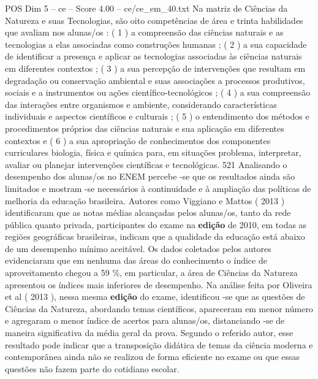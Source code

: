 \begin{textsample}{POS Dim 5 – ce – Score 4.00 – ce/ce\_em\_40.txt}
Na matriz de Ciências da Natureza e suas Tecnologias, são oito competências de área e trinta habilidades que avaliam nos alunas/os : ( 1 ) a compreensão das ciências naturais e as tecnologias a elas associadas como construções humanas ; ( 2 ) a sua capacidade de identificar a presença e aplicar as tecnologias associadas às ciências naturais em diferentes contextos ; ( 3 ) a sua percepção de intervenções que resultam em degradação ou conservação ambiental e suas associações a processos produtivos, sociais e a instrumentos ou ações científico-tecnológicos ; ( 4 ) a sua compreensão das interações entre organismos e ambiente, considerando características individuais e aspectos científicos e culturais ; ( 5 ) o entendimento dos métodos e procedimentos próprios das ciências naturais e sua aplicação em diferentes contextos e ( 6 ) a sua apropriação de conhecimentos dos componentes curriculares biologia, física e química para, em situações problema, interpretar, avaliar ou planejar intervenções científicas e tecnológicas. 521 Analisando o desempenho dos alunas/os no ENEM percebe -se que os resultados ainda são limitados e mostram -se necessários à continuidade e à ampliação das políticas de melhoria da educação brasileira.
Autores como Viggiano e Mattos ( 2013 ) identificaram que as notas médias alcançadas pelos alunas/os, tanto da rede pública quanto privada, participantes do exame na \textbf{edição} de 2010, em todas as regiões geográficas brasileiras, indicam que a qualidade da educação está abaixo de um desempenho mínimo aceitável.
Os dados coletados pelos autores evidenciaram que em nenhuma das áreas do conhecimento o índice de aproveitamento chegou a 59 \%, em particular, a área de Ciências da Natureza apresentou os índices mais inferiores de desempenho.
Na análise feita por Oliveira et al ( 2013 ), nessa mesma \textbf{edição} do exame, identificou -se que as questões de Ciências da Natureza, abordando temas científicos, apareceram em menor número e agregaram o menor índice de acertos para alunas/os, distanciando -se de maneira significativa da média geral da prova.
Segundo o referido autor, esse resultado pode indicar que a transposição didática de temas da ciência moderna e contemporânea ainda não se realizou de forma eficiente no exame ou que essas questões não fazem parte do cotidiano escolar.

\end{textsample}
